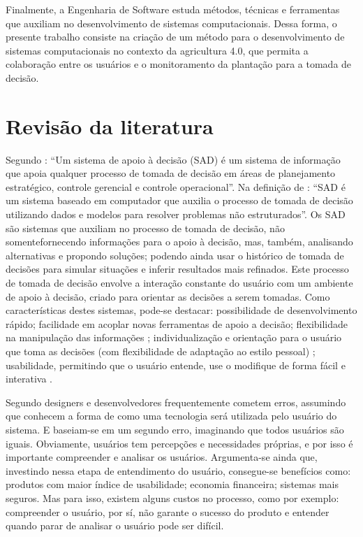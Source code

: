 \documentclass[12pt]{article}
\begin{document}
Finalmente, a Engenharia de Software estuda métodos, técnicas e ferramentas que auxiliam no desenvolvimento de sistemas computacionais. Dessa forma, o presente trabalho consiste na criação de um método para o desenvolvimento de sistemas computacionais no contexto da agricultura 4.0, que permita a colaboração entre os usuários e o monitoramento da plantação para a tomada de decisão.

\section{Revisão da literatura}
\label{sec:revisao_literatura}

Segundo : ``Um sistema de apoio à decisão (SAD) é um sistema de informação que apoia qualquer processo de tomada de decisão em áreas de planejamento estratégico, controle gerencial e controle operacional''. Na definição de : ``SAD é um sistema baseado em computador que auxilia o processo de tomada de decisão utilizando dados e modelos para resolver problemas não estruturados''. Os SAD são sistemas que auxiliam no processo de tomada de decisão, não somentefornecendo informações para o apoio à decisão, mas, também, analisando alternativas e propondo soluções; podendo ainda usar o histórico de tomada de decisões para simular situações e inferir resultados mais refinados. Este processo de tomada de decisão envolve a interação constante do usuário com um ambiente de apoio à decisão, criado para orientar as decisões a serem tomadas. Como características destes sistemas, pode-se destacar: possibilidade de desenvolvimento rápido; facilidade em acoplar novas ferramentas de apoio a decisão; flexibilidade na manipulação das informações \cite{John:1989}; individualização e orientação para o usuário que toma as decisões (com flexibilidade de adaptação ao estilo pessoal) \cite{Mittra:1986}; usabilidade, permitindo que o usuário entende, use o modifique de forma fácil e interativa \cite{Awad:1988}.

Segundo  designers e desenvolvedores frequentemente cometem erros, assumindo que conhecem a forma de como uma tecnologia será utilizada pelo usuário do sistema. E baseiam-se em um segundo erro, imaginando que todos usuários são iguais. Obviamente, usuários tem percepções e necessidades próprias, e por isso é importante compreender e analisar os usuários. Argumenta-se ainda que, investindo nessa etapa de entendimento do usuário, consegue-se benefícios como: produtos com maior índice de usabilidade; economia financeira; sistemas mais seguros. Mas para isso, existem alguns custos no processo, como por exemplo: compreender o usuário, por sí, não garante o sucesso do produto e entender quando parar de analisar o usuário pode ser difícil.
\end{document}
